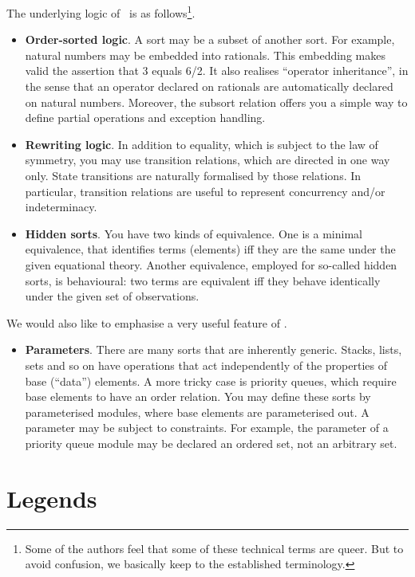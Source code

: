 \documentclass[a4paper]{memoir}
\begin{document}
The underlying logic of \cafeobj~is as follows\footnote{
 Some of the authors feel that some of these technical terms are
 queer. But to avoid confusion, we basically keep to the
 established terminology.
}.
\begin{itemize}
\item[]\textbf{ Order-sorted logic}\cite{osa}. A sort may be a subset of
  another sort. For example, natural numbers may be embedded into rationals.
  This embedding makes valid the assertion that 3 equals 6/2. It also
  realises ``operator inheritance'', in the sense that an operator
  declared on rationals are automatically declared on natural numbers.
  Moreover, the subsort relation offers you a simple way to define
  partial operations and exception handling.
\item[] \textbf{ Rewriting logic}\cite{rew-logic}. In addition to equality,
  which is subject to the law of symmetry, you may use transition relations,
  which are directed in one way only. State transitions are
  naturally formalised by those relations. In particular, transition
  relations are useful to represent concurrency and/or indeterminacy.
\item[]\textbf{ Hidden sorts}\cite{hsa}. You have two kinds of equivalence. One
  is a minimal equivalence, that identifies terms (elements) iff
  they are the same under the given equational theory. Another
  equivalence, employed for so-called hidden sorts, is behavioural:
  two terms are equivalent iff they behave identically under the
  given set of observations.
\end{itemize}
We would also like to emphasise a very useful feature of \cafeobj.
\begin{itemize}
\item[]\textbf{ Parameters}. There are many sorts that are inherently
  generic. Stacks, lists, sets and so on have operations that
  act independently of the properties of base (``data'') elements.
  A more tricky case is priority queues, which require base elements to
  have an order relation. You may define these sorts by
  parameterised modules, where base elements are parameterised out.
  A parameter may be subject to constraints. For example, the parameter
  of a priority queue module may be declared an ordered set, not
  an arbitrary set.
\end{itemize}

\section{Legends}
\end{document}

